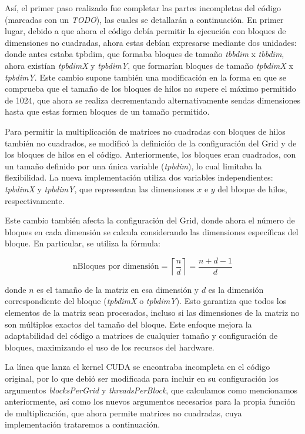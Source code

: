 \documentclass[twocolumn,a4paper,12pt]{article}
\begin{document}
Así, el primer paso realizado fue completar las partes incompletas del código (marcadas con un \textit{TODO}), las cuales se detallarán a continuación. En primer lugar, debido a que ahora el código debía permitir la ejecución con bloques de dimensiones no cuadradas, ahora estas debían expresarse mediante dos unidades: donde antes estaba tpbdim, que formaba bloques de tamaño \textit{tbbdim} x \textit{tbbdim}, ahora existían \textit{tpbdimX} y \textit{tpbdimY}, que formarían bloques de tamaño \textit{tpbdimX} x \textit{tpbdimY}. Este cambio supone también una modificación en la forma en que se comprueba que el tamaño de los bloques de hilos no supere el máximo permitido de 1024, que ahora se realiza decrementando alternativamente sendas dimensiones hasta que estas formen bloques de un tamaño permitido.

Para permitir la multiplicación de matrices no cuadradas con bloques de hilos también no cuadrados, se modificó la definición de la configuración del Grid y de los bloques de hilos en el código. Anteriormente, los bloques eran cuadrados, con un tamaño definido por una única variable (\textit{tpbdim}), lo cual limitaba la flexibilidad. La nueva implementación utiliza dos variables independientes: \textit{tpbdimX} y \textit{tpbdimY}, que representan las dimensiones \(x\) e \(y\) del bloque de hilos, respectivamente.

Este cambio también afecta la configuración del Grid, donde ahora el número de bloques en cada dimensión se calcula considerando las dimensiones específicas del bloque. En particular, se utiliza la fórmula:

\[
\text{nBloques por dimensión} = \left\lceil \frac{n}{d} \right\rceil = \frac{n + d - 1}{d}
\]

donde \(n\) es el tamaño de la matriz en esa dimensión y \(d\) es la dimensión correspondiente del bloque (\textit{tpbdimX} o \textit{tpbdimY}). Esto garantiza que todos los elementos de la matriz sean procesados, incluso si las dimensiones de la matriz no son múltiplos exactos del tamaño del bloque. Este enfoque mejora la adaptabilidad del código a matrices de cualquier tamaño y configuración de bloques, maximizando el uso de los recursos del hardware.

La línea que lanza el kernel CUDA se encontraba incompleta en el código original, por lo que debió ser modificada para incluir en su configuración los argumentos \textit{blocksPerGrid} y \textit{threadsPerBlock}, que calculamos como mencionamos anteriormente, así como los nuevos argumentos necesarios para la propia función de multiplicación, que ahora permite matrices no cuadradas, cuya implementación trataremos a continuación.
\end{document}
